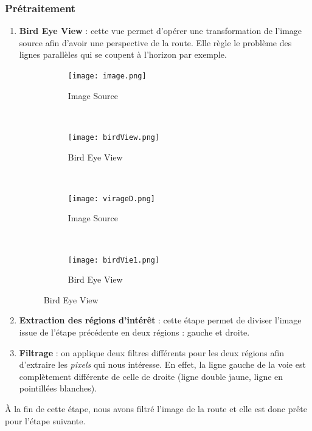 \documentclass[12pt, openany]{report}
\begin{document}
\subsubsection{Prétraitement}
\begin{enumerate}
    \item \textbf{Bird Eye View} : cette vue permet d'opérer une transformation de l'image source afin d'avoir une perspective de la route. Elle règle le problème des lignes parallèles qui se coupent à l'horizon par exemple.
\begin{figure}[H]
     \centering
     \begin{subfigure}[b]{0.4\textwidth}
         \centering
         \texttt{[image: image.png]}
         \caption{Image Source}
     \end{subfigure}
     ~
     \begin{subfigure}[b]{0.4\textwidth}
         \centering
         \texttt{[image: birdView.png]}
         \caption{Bird Eye View}
     \end{subfigure}
     \\
     \begin{subfigure}[b]{0.4\textwidth}
         \centering
         \texttt{[image: virageD.png]}
         \caption{Image Source}
     \end{subfigure}
     ~
     \begin{subfigure}[b]{0.4\textwidth}
         \centering
         \texttt{[image: birdVie1.png]}
         \caption{Bird Eye View}
     \end{subfigure}
     \caption{Bird Eye View}
     \label{fig:bev}     
\end{figure}
    \item \textbf{Extraction des régions d'intérêt} : cette étape permet de diviser l'image issue de l'étape précédente en deux régions : gauche et droite.
    \item \textbf{Filtrage} : on applique deux filtres différents pour les deux régions afin d'extraire les \textit{pixels} qui nous intéresse. En effet, la ligne gauche de la voie est complètement différente de celle de droite (ligne double jaune, ligne en pointillées blanches).
\end{enumerate}

À la fin de cette étape, nous avons filtré l'image de la route et elle est donc prête pour l'étape suivante.
\end{document}
